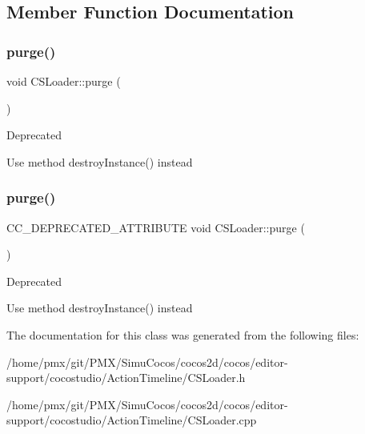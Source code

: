 \subsection{Member Function Documentation}
\mbox{\label{classCSLoader_a999ed52182d8aa9392919405ca096b66}} 
\subsubsection{\texorpdfstring{purge()}{purge()}\hspace{0.1cm}{\footnotesize\ttfamily [1/2]}}
{\footnotesize\ttfamily void C\+S\+Loader\+::purge (\begin{DoxyParamCaption}{ }\end{DoxyParamCaption})}

\begin{DoxyRefDesc}{Deprecated}
\item[\hyperlink{deprecated__deprecated000075}{Deprecated}]Use method destroy\+Instance() instead \end{DoxyRefDesc}
\mbox{\label{classCSLoader_aef90831844e5aa1b8c4b751ed2606b4c}} 
\subsubsection{\texorpdfstring{purge()}{purge()}\hspace{0.1cm}{\footnotesize\ttfamily [2/2]}}
{\footnotesize\ttfamily C\+C\+\_\+\+D\+E\+P\+R\+E\+C\+A\+T\+E\+D\+\_\+\+A\+T\+T\+R\+I\+B\+U\+TE void C\+S\+Loader\+::purge (\begin{DoxyParamCaption}{ }\end{DoxyParamCaption})}

\begin{DoxyRefDesc}{Deprecated}
\item[\hyperlink{deprecated__deprecated000310}{Deprecated}]Use method destroy\+Instance() instead \end{DoxyRefDesc}


The documentation for this class was generated from the following files\+:\begin{DoxyCompactItemize}
\item 
/home/pmx/git/\+P\+M\+X/\+Simu\+Cocos/cocos2d/cocos/editor-\/support/cocostudio/\+Action\+Timeline/C\+S\+Loader.\+h\item 
/home/pmx/git/\+P\+M\+X/\+Simu\+Cocos/cocos2d/cocos/editor-\/support/cocostudio/\+Action\+Timeline/C\+S\+Loader.\+cpp\end{DoxyCompactItemize}
